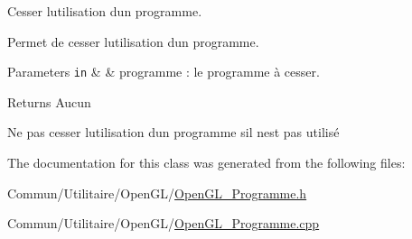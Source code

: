 Cesser l\textquotesingle{}utilisation d\textquotesingle{}un programme. 

Permet de cesser l\textquotesingle{}utilisation d\textquotesingle{}un programme.


\begin{DoxyParams}[1]{Parameters}
\mbox{\tt in}  & {\em } & programme \+: le programme à cesser.\\
\hline
\end{DoxyParams}
\begin{DoxyReturn}{Returns}
Aucun 
\end{DoxyReturn}
Ne pas cesser l\textquotesingle{}utilisation d\textquotesingle{}un programme s\textquotesingle{}il n\textquotesingle{}est pas utilisé 

The documentation for this class was generated from the following files\+:\begin{DoxyCompactItemize}
\item 
Commun/\+Utilitaire/\+Open\+G\+L/\hyperlink{_open_g_l___programme_8h}{Open\+G\+L\+\_\+\+Programme.\+h}\item 
Commun/\+Utilitaire/\+Open\+G\+L/\hyperlink{_open_g_l___programme_8cpp}{Open\+G\+L\+\_\+\+Programme.\+cpp}\end{DoxyCompactItemize}
